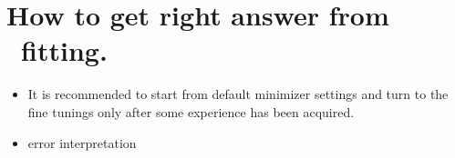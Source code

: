 \section {How to get right answer from \BornAgain\ fitting.} 

\begin{itemize}
\item It is recommended to start from default minimizer settings and turn to the fine tunings
only after some experience has been acquired.
\item error interpretation

\end{itemize}
